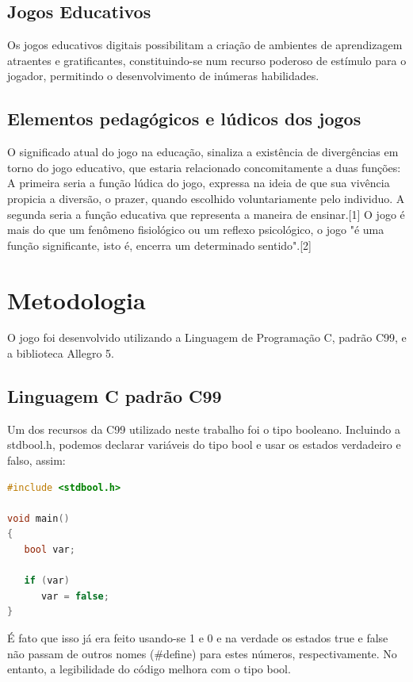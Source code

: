 \documentclass[12pt]{article}
\begin{document}
\subsection{Jogos Educativos}
Os jogos educativos digitais possibilitam a criação de ambientes de
aprendizagem atraentes e gratificantes, constituindo-se num recurso poderoso de estímulo para o jogador, permitindo o desenvolvimento de inúmeras habilidades. 

\subsection{Elementos pedagógicos e lúdicos dos jogos}
O significado atual do jogo na educação, sinaliza a existência  de divergências em torno do jogo educativo, que estaria relacionado concomitamente a duas funções:
A primeira seria a função lúdica do jogo, expressa na ideia de que sua vivência propicia a diversão, o prazer, quando escolhido voluntariamente pelo individuo. A segunda seria a função educativa que representa a maneira de ensinar.[1]
O  jogo é mais do que um fenômeno fisiológico ou um reflexo psicológico, o jogo "é uma função significante, isto é, encerra um determinado sentido".[2] 

\section{Metodologia}
O jogo foi desenvolvido utilizando a Linguagem de Programação C, padrão C99, e a biblioteca Allegro 5. 

\subsection{Linguagem C padrão C99}

Um dos recursos da C99 utilizado neste trabalho foi o tipo booleano. Incluindo a stdbool.h, podemos declarar variáveis do tipo bool e usar os estados verdadeiro e falso, assim:
\begin{lstlisting}[language=cpp,caption={{Demonstração do tipo bool na linguagem C\\\\}}]
#include <stdbool.h>

void main()
{
   bool var;

   if (var)
      var = false;
}
\end{lstlisting}
É fato que isso já era feito usando-se 1 e 0 e na verdade os estados true e false não passam de outros nomes (#define) para estes números, respectivamente. No entanto, a legibilidade do código melhora com o tipo bool.
\end{document}
